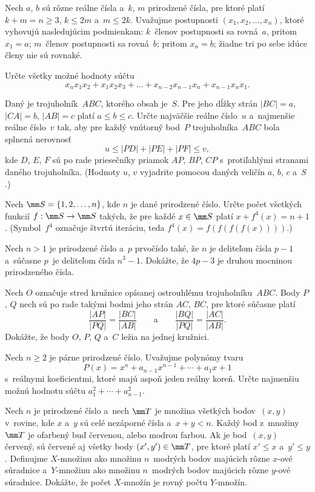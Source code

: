 {%
Nech $a$, $b$ sú rôzne reálne čísla a~$k$, $m$
prirodzené čísla, pre ktoré platí $k+m=n\geq 3$, $k\leq 2m$ a~$m\leq
2k$. Uvažujme postupnosti $(x_1,x_2,\dots ,x_n)$, ktoré vyhovujú
nasledujúcim podmienkam:
\ite{} $k$~členov postupnosti sa rovná~$a$, pritom $x_1=a$;
\ite{} $m$~členov postupnosti sa rovná~$b$; pritom $x_n=b$;
\ite{} žiadne tri po sebe idúce členy nie sú rovnaké.

\noindent
Určte všetky možné hodnoty súčtu
$$
x_nx_1x_2+x_1x_2x_3+\dots +x_{n-2}x_{n-1}x_n+x_{n-1}x_nx_1.
$$}

{%
Daný je trojuholník~$ABC$, ktorého obsah je~$S$. Pre jeho dĺžky
strán $|BC|=a$, $|CA|=b$, $|AB|=c$ platí $a\leq b\leq c$. Určte
najväčšie reálne číslo~$u$ a~najmenšie reálne číslo~$v$ tak, aby
pre každý vnútorný bod~$P$ trojuholníka~$ABC$ bola splnená
nerovnosť
$$
u\leq |PD|+|PE|+|PF|\leq v,
$$
kde $D$, $E$, $F$ sú po rade priesečníky priamok $AP$, $BP$, $CP$
s~protiľahlými stranami daného trojuholníka.
(Hodnoty $u$, $v$ vyjadrite pomocou daných veličín $a$, $b$, $c$
a~$S$.)}

{%
Nech $\mm S=\{1,2,\dots,n\}$, kde $n$ je dané prirodzené číslo.
Určte počet všetkých funkcií $f:\mm S\to\mm S$ takých, že pre každé
$x\in\mm S$ platí $x+f^4(x)=n+1$.
(Symbol~$f^4$ označuje štvrtú iteráciu, teda $f^4(x)=f(f(f(f(x))))$.)}

{%
Nech $n>1$ je prirodzené číslo a~$p$ prvočíslo také, že $n$ je
deliteľom čísla $p-1$ a~súčasne $p$~je deliteľom čísla $n^3-1$.
Dokážte, že $4p-3$ je druhou mocninou prirodzeného čísla.}

{%
Nech $O$ označuje stred kružnice opísanej ostrouhlému trojuholníku~$ABC$.
Body $P$, $Q$ nech sú po rade takými bodmi jeho strán
$AC$, $BC$, pre ktoré súčasne platí
$$
\frac{|AP|}{|PQ|}=\frac{|BC|}{|AB|} \qquad \text{a} \qquad
      \frac{|BQ|}{|PQ|}=\frac{|AC|}{|AB|}.
$$
Dokážte, že body $O$, $P$, $Q$ a~$C$ ležia na jednej kružnici.}

{%
Nech $n\geq 2$ je párne prirodzené číslo. Uvažujme polynómy tvaru
$$
P(x)=x^n+a_{n-1}x^{n-1}+\cdots +a_1x+1
$$
s~reálnymi koeficientmi, ktoré majú aspoň jeden reálny koreň.
Určte najmenšiu možnú hodnotu súčtu $a_1^2+\cdots +a_{n-1}^2$.}

{%
Nech $n$ je prirodzené číslo a~nech $\mm T$ je množina všetkých bodov~$(x,y)$
v~rovine, kde $x$ a~$y$ sú celé nezáporné čísla
a~$x+y<n$. Každý bod z~množiny~$\mm T$ je ofarbený buď červenou, alebo
modrou farbou. Ak je bod~$(x,y)$ červený, sú červené aj všetky body
$(x',y')\in\mm T$, pre ktoré platí $x'\leq x$ a~$y'\leq y$.
Definujme $X$-množinu ako množinu $n$~modrých bodov majúcich
rôzne $x$-ové súradnice a~$Y$-množinu ako množinu $n$~modrých
bodov majúcich rôzne $y$-ové súradnice. Dokážte, že počet
$X$-množín je rovný počtu $Y$-množín.}

